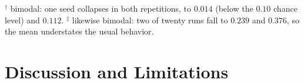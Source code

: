 \documentclass[preprint,12pt]{elsarticle}
\begin{document}
\begin{table}[t]
\centering
\caption{No-source few-shot setting, target load~3, macro-F1. Each cell is
$\text{mean} \pm \text{SD}$ over $20$ runs (ten seeds, the whole configuration
repeated twice).
Augmentations add $400$ samples per class generated from the $k$ labeled
support samples only; the last row draws from the target pool that is neither
support nor test.}
\label{tab:fewshot}
\footnotesize
{}
\par\vspace{2pt}
\footnotesize $^{\dagger}$ bimodal: one seed collapses in both repetitions, to
$0.014$ (below the $0.10$ chance level) and $0.112$. $^{\ddagger}$ likewise
bimodal: two of twenty runs fall to $0.239$ and $0.376$, so the mean understates
the usual behavior.
\end{table}

\section{Discussion and Limitations}
\label{sec:discussion}
\end{document}
